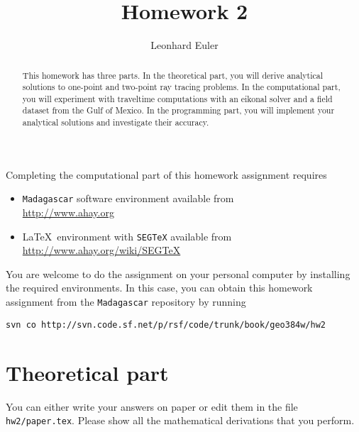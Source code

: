 \author{Leonhard Euler} 
\title{Homework 2}

\begin{abstract}
  This homework has three parts. In the theoretical part, you will
  derive analytical solutions to one-point and two-point ray tracing
  problems. In the computational part, you will experiment with
  traveltime computations with an eikonal solver and a field dataset
  from the Gulf of Mexico. In the programming part, you will implement
  your analytical solutions and investigate their accuracy.
\end{abstract}

Completing the computational part of this homework assignment requires
\begin{itemize}
\item \texttt{Madagascar} software environment available from \\
  \url{http://www.ahay.org}
\item \LaTeX\ environment with \texttt{SEGTeX} available from \\ 
  \url{http://www.ahay.org/wiki/SEGTeX}
\end{itemize}

You are welcome to do the assignment on your personal computer by
installing the required environments. In this case, you can obtain this
homework assignment from the \texttt{Madagascar} repository by running
\begin{verbatim}
svn co http://svn.code.sf.net/p/rsf/code/trunk/book/geo384w/hw2
\end{verbatim}

\section{Theoretical part}

You can either write your answers on paper or edit them in the file
\verb#hw2/paper.tex#. Please show all the mathematical
derivations that you perform.

